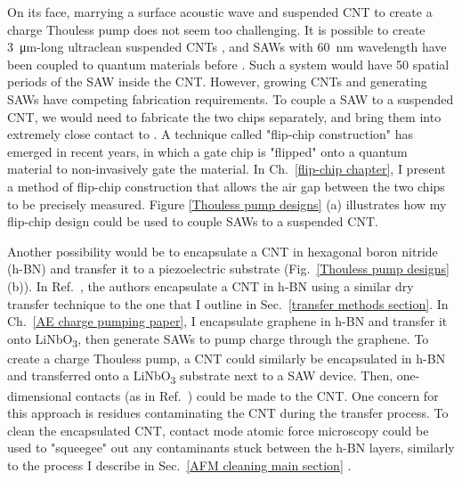 \documentclass[double,12pt,1in,seploa]{beavtex}
\begin{document}
On its face, marrying a surface acoustic wave and suspended CNT to create a charge Thouless pump does not seem too challenging. It is possible to create \SI{3}{\micro\meter}-long ultraclean suspended CNTs \cite{senger_universal_2018}, and SAWs with \SI{60}{\nano\meter} wavelength have been coupled to quantum materials before \cite{kukushkin_collective_2011}. Such a system would have 50 spatial periods of the SAW inside the CNT. However, growing CNTs and generating SAWs have competing fabrication requirements. To couple a SAW to a suspended CNT, we would need to fabricate the two chips separately, and bring them into extremely close contact to . A technique called "flip-chip construction" has emerged in recent years, in which a gate chip is "flipped" onto a quantum material to non-invasively gate the material. In Ch.\ \ref{flip-chip chapter}, I present a method of flip-chip construction that allows the air gap between the two chips to be precisely measured. Figure \ref{Thouless pump designs} (a) illustrates how my flip-chip design could be used to couple SAWs to a suspended CNT.

Another possibility would be to encapsulate a CNT in hexagonal boron nitride (h-BN) and transfer it to a piezoelectric substrate (Fig.\ \ref{Thouless pump designs} (b)). In Ref.\ \cite{huang_superior_2015}, the authors encapsulate a CNT in h-BN using a similar dry transfer technique to the one that I outline in Sec.\ \ref{transfer methods section}. In Ch.\ \ref{AE charge pumping paper}, I encapsulate graphene in h-BN and transfer it onto LiNbO\textsubscript{3}, then generate SAWs to pump charge through the graphene. To create a charge Thouless pump, a CNT could similarly be encapsulated in h-BN and transferred onto a LiNbO\textsubscript{3} substrate next to a SAW device. Then, one-dimensional contacts (as in Ref.\ \cite{huang_superior_2015}) could be made to the CNT. One concern for this approach is residues contaminating the CNT during the transfer process. To clean the encapsulated CNT, contact mode atomic force microscopy could be used to "squeegee" out any contaminants stuck between the h-BN layers, similarly to the process I describe in Sec.\ \ref{AFM cleaning main section} \cite{goossens_mechanical_2012,chen_tip-based_2021}. 
\end{document}

